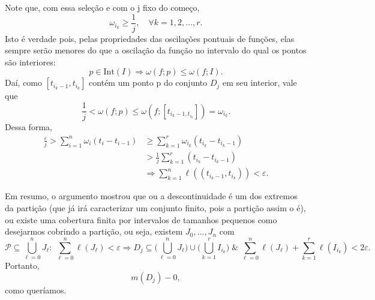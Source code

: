 \documentclass[../analysisII_notes.tex]{subfiles}
\begin{document}
\begin{proof*}
	Note que, com essa seleção e com o j fixo do começo,
	\[
		\omega_{i_k} \geq \frac{1}{j},\quad \forall k=1, 2, \dotsc , r.
	\]
	Isto é verdade pois, pelas propriedades das oscilações pontuais de funções, elas sempre serão menores do que a oscilação da função no intervalo do qual os pontos são interiores:
	\[
		p\in \mathrm{Int}(I) \Rightarrow \omega(f; p) \leq \omega (f; I).
	\]
	Daí, como \([t_{i_{k}-1}, t_{i_{k}}]\) contém um ponto p do conjunto \(D_{j}\) em seu interior, vale que
	\[
		\frac{1}{j}<\omega (f; p) \leq \omega (f; [t_{i_k-1, t_{i_k}}]) = \omega_{i_{k}}.
	\]
	Dessa forma,
	\begin{align*}
		\frac{\varepsilon }{j} > \sum\limits_{i=1}^{n}\omega_{i}(t_{i}-t_{i-1}) & \geq \sum\limits_{k=1}^{r}\omega_{i_{k}}(t_{i_k}-t_{i_{k}-1})                    \\
		                                                                        & > \frac{1}{j}\sum\limits_{k=1}^{r}(t_{i_{k}}-t_{i_{k}-1})                        \\
		                                                                        & \Rightarrow \sum\limits_{k=1}^{n}\ell ((t_{i_{k}-1}, t_{i_{k}})) < \varepsilon .
	\end{align*}

	Em resumo, o argumento mostrou que ou a descontinuidade é um dos extremos da partição (que já irá caracterizar um conjunto finito, pois a partição assim o é), ou existe uma cobertura finita por intervalos de tamanhos pequenos como desejarmos cobrindo a partição, ou seja, existem \(J_{0}, \dotsc , J_{n}\) com
	\[
		\mathcal{P}\subseteq \bigcup_{\ell =0}^{n}J_{\ell}:\; \sum\limits_{\ell =0}^{n}\ell (J_{\ell }) < \varepsilon  \Rightarrow D_{j} \subseteq \biggl(\bigcup_{\ell =0}^{n}J_{\ell}\biggr)\cup \biggl(\bigcup_{k=1}^{r}I_{i_{k}}\biggr)\;\&\; \sum\limits_{\ell =0}^{n}\ell (J_{\ell}) + \sum\limits_{k=1}^{r}\ell (I_{i_{k}}) < 2\varepsilon.
	\]
	Portanto,
	\[
		m(D_{j}) - 0,
	\]
	como queríamos.


\end{proof*}
\end{document}
